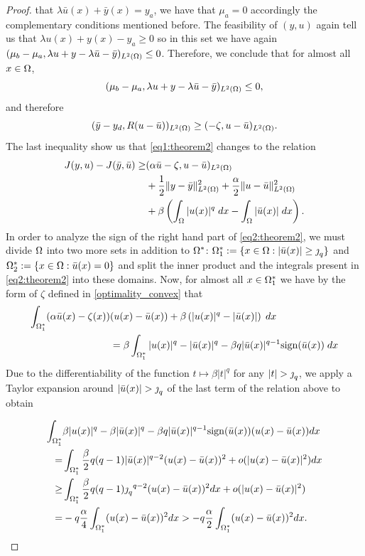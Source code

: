 \begin{proof}
  that $\lambda \bar{u}(x)+\bar{y}(x)=y_a$, we have that $\mu_a=0$ accordingly the 
  complementary conditions mentioned before. The feasibility of $(y,u)$ again tell us 
  that $\lambda u(x)+y(x)-y_a\ge 0$ so in this set we have again 
  $(\mu_b-\mu_a,\lambda u+y-\lambda \bar{u}-\bar{y})_{L^2(\Omega)}\le 0$. Therefore, we conclude that for almost all $x\in \Omega$,
  \[
  (\mu_b-\mu_a,\lambda u+y-\lambda \bar{u}-\bar{y})_{L^2(\Omega)}\le 0,
  \]
  and therefore
  \[
  (\bar{y}-y_d, R(u-\bar{u}))_{L^2(\Omega)}\ge (-\zeta,u-\bar{u})_{L^2(\Omega)}.
  \]
  The last inequality show us that \eqref{eq1:theorem2} changes to the relation
  \begin{equation}\label{eq2:theorem2}
     \begin{split}
        J(y,u)-J(\bar{y},\bar{u})\ge&(\alpha\bar{u}-\zeta,u-\bar{u})_{L^2(\Omega)}\\
        &+\frac{1}{2}\lVert y-\bar{y} \rVert_{L^2(\Omega)}^2+\frac{\alpha}{2}\lVert u-\bar{u} \rVert_{L^2(\Omega)}^2\\
        &+\beta\left(\int_{\Omega}|u(x)|^q\; dx-\int_{\Omega}|\bar{u}(x)|\; dx\right).
        \end{split}
    \end{equation}
In order to analyze the sign of the right hand part of \eqref{eq2:theorem2}, 
we must divide $\Omega$ into two more sets in addition to 
$\Omega^*$: $\Omega_1^*:=\{x\in \Omega:|\bar{u}(x)|\ge \operatorname{\jmath}_q\}$ and 
$\Omega^*_2:=\{x\in\Omega:\bar{u}(x)=0\}$ and split the inner product and the 
integrals present in \eqref{eq2:theorem2} into these domains. Now, for 
almost all $x\in \Omega_1^*$ we have by the form of $\zeta$ defined in \eqref{optimality_convex} that
\begin{align*}   
\int_{\Omega_1^*}(\alpha\bar{u}(x)-\zeta(x))&(u(x)-\bar{u}(x))+\beta\left(|u(x)|^q-|\bar{u}(x)|\right)\; dx\\
&=\beta\int_{\Omega_1^*}|u(x)|^q-|\bar u(x)|^q - \beta q |\bar{u}(x)|^{q-1}\mathrm{sign}(\bar u(x))\;dx    
\end{align*}
Due to the differentiability of the function $t\mapsto \beta |t|^{q}$ for
any $|t|>\jump_q$, we apply a Taylor expansion around $|\bar u(x)|>\jump_q$ of the 
last term of the relation above to obtain

\begin{align}
\int_{\Omega_1^*} &\beta |u(x)|^q- \beta |\bar u(x)|^q  
-\beta q |\bar u(x)|^{q-1}\mathrm{sign}(\bar u(x))(u(x)- \bar u(x)) dx\nonumber\\
=& \int_{\Omega_1^*} 
\frac{\beta}{2}q(q-1)|\bar u(x)|^{q-2} (u(x)- \bar u(x))^2 
+ o(|u(x)- \bar u(x)|^2) dx \nonumber\\
\geq & \int_{\Omega_1^*} 
\frac{\beta}{2}q(q-1){\operatorname{\jmath}_q}^{q-2} (u(x)- \bar u(x))^2 dx  
+ o(|u(x)- \bar u(x)|^2) \nonumber \\
= & -q\frac{\alpha}{4}\int_{\Omega_1^*} (u(x)- \bar u(x))^2 dx
>-q\frac{\alpha}{2}\int_{\Omega_1^*} (u(x)- \bar u(x))^2 dx. 
\label{eq:om1} 
\end{align}


\end{proof}
